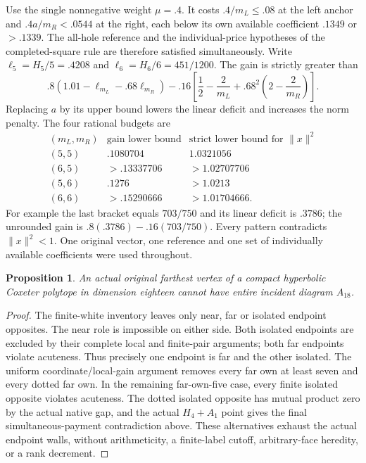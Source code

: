 \documentclass[11pt]{article}
\newtheorem{proposition}[theorem]{Proposition}
\theoremstyle{definition}
\theoremstyle{remark}
\newcommand{\norm}[1]{\lVert #1\rVert}
\begin{document}
Use the single nonnegative weight \(\mu=.4\).
It costs \(.4/m_L\leq.08\) at the left anchor and
\(.4a/m_R<.0544\) at the right, each below its own available
coefficient \(.1349\) or \(>.1339\).
The all-hole reference and the individual-price hypotheses of
the completed-square rule are therefore satisfied simultaneously.
Write
\(\ell_5=H_5/5=.4208\) and
\(\ell_6=H_6/6=451/1200\).
The gain is strictly greater than
\[
 .8(1.01-\ell_{m_L}-.68\ell_{m_R})
 -.16\left[\frac12-\frac2{m_L}
             +.68^2\left(2-\frac2{m_R}\right)\right].
\]
Replacing \(a\) by its upper bound lowers the linear deficit
and increases the norm penalty. The four rational budgets are
\[
\begin{array}{c|c|c}
(m_L,m_R)&\text{gain lower bound}&
 \text{strict lower bound for }\norm{x}^2\\ \hline
(5,5)&.1080704&1.0321056\\
(6,5)&>.13337706&>1.02707706\\
(5,6)&.1276&>1.0213\\
(6,6)&>.15290666&>1.01704666 .
\end{array}
\]
For example the last bracket equals \(703/750\) and its
linear deficit is \(.3786\); the unrounded gain is
\(.8(.3786)-.16(703/750)\).
Every pattern contradicts \(\norm{x}^2<1\).
One original vector, one reference and one set of individually
available coefficients were used throughout.

\begin{proposition}\label{app:prop:wholeA18}
An actual original farthest vertex of a compact hyperbolic Coxeter
polytope in dimension eighteen cannot have entire incident diagram
\(A_{18}\).
\end{proposition}
\begin{proof}
The finite-white inventory leaves only near, far or isolated
endpoint opposites. The near role is impossible on either side.
Both isolated endpoints are excluded by their complete local and
finite-pair arguments; both far endpoints violate acuteness.
Thus precisely one endpoint is far and the other isolated.
The uniform coordinate/local-gain argument removes every far
own at least seven and every dotted far own. In the remaining
far-own-five case, every finite isolated opposite violates
acuteness. The dotted isolated opposite has mutual product zero
by the actual native gap, and the actual \(H_4+A_1\) point gives
the final simultaneous-payment contradiction above.
These alternatives exhaust the actual endpoint walls, without
arithmeticity, a finite-label cutoff, arbitrary-face heredity,
or a rank decrement.
\end{proof}
\end{document}
